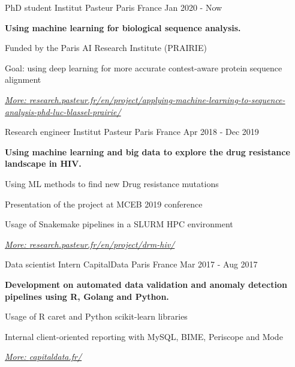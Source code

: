 \documentclass[11pt, a4paper]{awesome-cv}
\begin{document}
\makecvheader
{}

\begin{cventries}
\cventry
{PhD student}
{Institut Pasteur}
{Paris France}
{Jan 2020 - Now}
{
\begin{cvitems}
\item{\textbf{Using machine learning for biological sequence analysis.}}
\item{Funded by the Paris AI Research Institute (PRAIRIE)}
\item{Goal: using deep learning for more accurate contest-aware protein sequence alignment}
\item{\emph{ \href{https://research.pasteur.fr/en/project/applying-machine-learning-to-sequence-analysis-phd-luc-blassel-prairie/}{More: \tiny{research.pasteur.fr/en/project/applying-machine-learning-to-sequence-analysis-phd-luc-blassel-prairie/}} } }
\end{cvitems}
}


\cventry
{Research engineer}
{Institut Pasteur}
{Paris France}
{Apr 2018 - Dec 2019}
{
\begin{cvitems}
\item{\textbf{Using machine learning and big data to explore the drug resistance landscape in HIV.}}
\item{Using ML methods to find new Drug resistance mutations}
\item{Presentation of the project at MCEB 2019 conference}
\item{Usage of Snakemake pipelines in a SLURM HPC environment}
\item{\emph{ \href{https://research.pasteur.fr/en/project/drm-hiv/}{More: \tiny{research.pasteur.fr/en/project/drm-hiv/}} } }
\end{cvitems}
}


\cventry
{Data scientist Intern}
{CapitalData}
{Paris France}
{Mar 2017 - Aug 2017}
{
\begin{cvitems}
\item{\textbf{Development on automated data validation and anomaly detection pipelines using R, Golang and Python.}}
\item{Usage of R caret and Python scikit-learn libraries}
\item{Internal client-oriented reporting with MySQL, BIME, Periscope and Mode}
\item{\emph{ \href{https://www.capitaldata.fr/}{More: \tiny{capitaldata.fr/}} } }
\end{cvitems}
}
\end{cventries}
\end{document}
